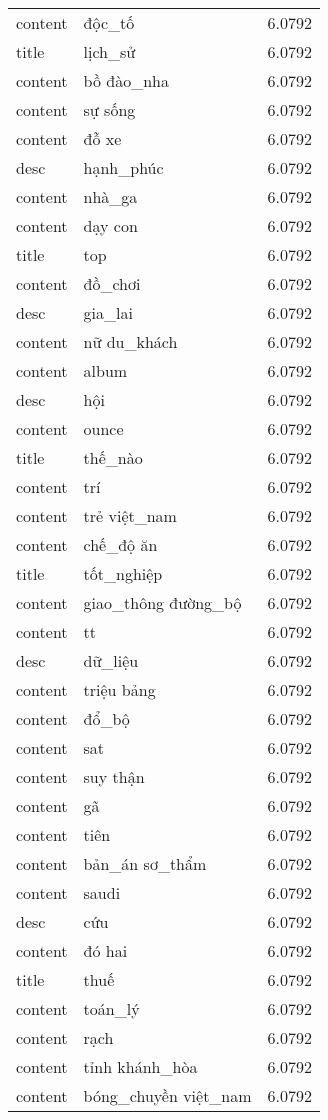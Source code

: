 \documentclass{article}
\begin{document}
\begin{tabular}{lll}
content & độc\_tố & 6.0792\\
title & lịch\_sử & 6.0792\\
content & bồ đào\_nha & 6.0792\\
content & sự sống & 6.0792\\
content & đỗ xe & 6.0792\\
desc & hạnh\_phúc & 6.0792\\
content & nhà\_ga & 6.0792\\
content & dạy con & 6.0792\\
title & top & 6.0792\\
content & đồ\_chơi & 6.0792\\
desc & gia\_lai & 6.0792\\
content & nữ du\_khách & 6.0792\\
content & album & 6.0792\\
desc & hội & 6.0792\\
content & ounce & 6.0792\\
title & thế\_nào & 6.0792\\
content & trí & 6.0792\\
content & trẻ việt\_nam & 6.0792\\
content & chế\_độ ăn & 6.0792\\
title & tốt\_nghiệp & 6.0792\\
content & giao\_thông đường\_bộ & 6.0792\\
content & tt & 6.0792\\
desc & dữ\_liệu & 6.0792\\
content & triệu bảng & 6.0792\\
content & đổ\_bộ & 6.0792\\
content & sat & 6.0792\\
content & suy thận & 6.0792\\
content & gã & 6.0792\\
content & tiên & 6.0792\\
content & bản\_án sơ\_thẩm & 6.0792\\
content & saudi & 6.0792\\
desc & cứu & 6.0792\\
content & đó hai & 6.0792\\
title & thuế & 6.0792\\
content & toán\_lý & 6.0792\\
content & rạch & 6.0792\\
content & tỉnh khánh\_hòa & 6.0792\\
content & bóng\_chuyền việt\_nam & 6.0792\\

\end{tabular}
\end{document}
